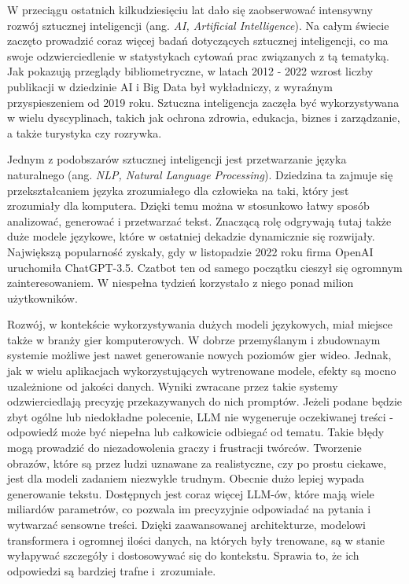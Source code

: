 W przeciągu ostatnich kilkudziesięciu lat dało się zaobserwować intensywny rozwój sztucznej inteligencji (ang. \textit{AI, Artificial Intelligence}). Na całym świecie zaczęto prowadzić coraz więcej badań dotyczących sztucznej inteligencji, co ma swoje odzwierciedlenie w statystykach cytowań prac związanych z tą tematyką. Jak pokazują przeglądy bibliometryczne, w latach 2012 - 2022 wzrost liczby publikacji w dziedzinie AI i Big Data był wykładniczy, z wyraźnym przyspieszeniem od 2019 roku\cite{p_v_thayyib_2023}. Sztuczna inteligencja zaczęła być wykorzystywana w wielu dyscyplinach, takich jak ochrona zdrowia, edukacja, biznes i zarządzanie, a także turystyka czy rozrywka. 

Jednym z podobszarów sztucznej inteligencji jest przetwarzanie języka naturalnego (ang. \textit{NLP, Natural Language Processing}). Dziedzina ta zajmuje się przekształcaniem języka zrozumiałego dla człowieka na taki, który jest zrozumiały dla komputera. Dzięki temu można w stosunkowo łatwy sposób analizować, generować i przetwarzać tekst. Znaczącą rolę odgrywają tutaj także duże modele językowe, które w ostatniej dekadzie dynamicznie się rozwijały. Największą popularność zyskały, gdy w listopadzie 2022 roku firma OpenAI uruchomiła ChatGPT-3.5. Czatbot ten od samego początku cieszył się ogromnym zainteresowaniem. W niespełna tydzień korzystało z niego ponad milion użytkowników\cite{ChatGPT2024}.

Rozwój, w kontekście wykorzystywania dużych modeli językowych, miał miejsce także w branży gier komputerowych. W dobrze przemyślanym i zbudownaym systemie możliwe jest nawet generowanie nowych poziomów gier wideo. Jednak, jak w wielu aplikacjach wykorzystujących wytrenowane modele, efekty są mocno uzależnione od jakości danych\cite{Todd_2023}. Wyniki zwracane przez takie systemy odzwierciedlają precyzję przekazywanych do nich promptów. Jeżeli podane będzie zbyt ogólne lub niedokładne polecenie, LLM nie wygeneruje oczekiwanej treści - odpowiedź może być niepełna lub całkowicie odbiegać od tematu. Takie błędy mogą prowadzić do niezadowolenia graczy i frustracji twórców. Tworzenie obrazów, które są przez ludzi uznawane za realistyczne, czy po prostu ciekawe, jest dla modeli zadaniem niezwykle trudnym. Obecnie dużo lepiej wypada generowanie tekstu. Dostępnych jest coraz więcej LLM-ów, które mają wiele miliardów parametrów, co pozwala im precyzyjnie odpowiadać na pytania i wytwarzać sensowne treści. Dzięki zaawansowanej architekturze, modelowi transformera i ogromnej ilości danych, na których były trenowane, są w stanie wyłapywać szczegóły i dostosowywać się do kontekstu. Sprawia to, że ich odpowiedzi są bardziej trafne i~zrozumiałe.

